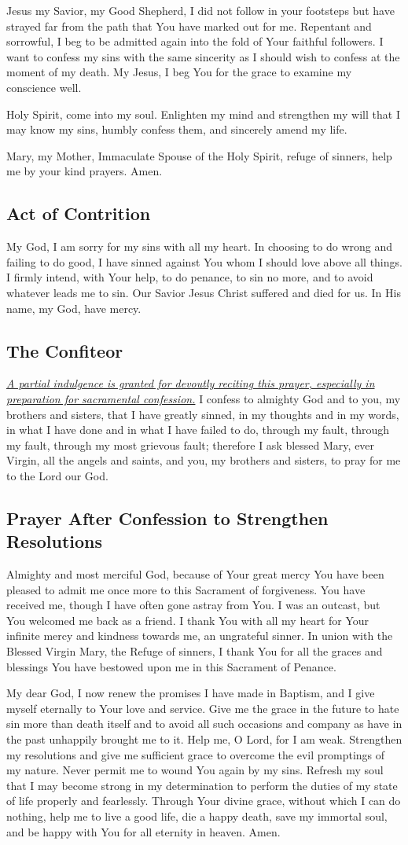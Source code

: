 \documentclass[12pt]{article}
\newcommand{\prayertitle}[1]{\subsection{#1}}
\newcommand{\indulgencedprayertitle}[1]{\prayertitle{#1 \protect\kreuz}}
\newcommand{\note}[1]{{\small{\textsl{#1}}}\newline}
\newcommand{\linkednote}[2]{\hyperlink{#1}{\note{#2}}}
\begin{document}
Jesus my Savior, my Good Shepherd, I did not follow in your footsteps but have strayed far from the path that You have marked out for me.
Repentant and sorrowful, I beg to be admitted again into the fold of Your faithful followers.
I want to confess my sins with the same sincerity as I should wish to confess at the moment of my death.
My Jesus, I beg You for the grace to examine my conscience well.

Holy Spirit, come into my soul.
Enlighten my mind and strengthen my will that I may know my sins, humbly confess them, and sincerely amend my life.

Mary, my Mother, Immaculate Spouse of the Holy Spirit, refuge of sinners, help me by your kind prayers. Amen.

\prayertitle{Act of Contrition}
My God,
I am sorry for my sins with all my heart.
In choosing to do wrong and failing to do good, I have sinned against You whom I should love above all things.
I firmly intend, with Your help, to do penance, to sin no more, and to avoid whatever leads me to sin.
Our Savior Jesus Christ suffered and died for us.
In His name, my God, have mercy.

\indulgencedprayertitle{The Confiteor}
\linkednote{grant9}{A partial indulgence is granted for devoutly reciting this prayer, especially in preparation for sacramental confession.}
I confess to almighty God and to you, my brothers and sisters, that I have greatly sinned, in my thoughts and in my words, in what I have done and in what I have failed to do, through my fault, through my fault, through my most grievous fault;
therefore I ask blessed Mary, ever Virgin, all the angels and saints, and you, my brothers and sisters, to pray for me to the Lord our God.

\prayertitle{Prayer After Confession to Strengthen Resolutions}
Almighty and most merciful God, because of Your great mercy You have been pleased to admit me once more to this Sacrament of forgiveness.
You have received me, though I have often gone astray from You.
I was an outcast, but You welcomed me back as a friend.
I thank You with all my heart for Your infinite mercy and kindness towards me, an ungrateful sinner.
In union with the Blessed Virgin Mary, the Refuge of sinners, I thank You for all the graces and blessings You have bestowed upon me in this Sacrament of Penance.

My dear God, I now renew the promises I have made in Baptism, and I give myself eternally to Your love and service.
Give me the grace in the future to hate sin more than death itself and to avoid all such occasions and company as have in the past unhappily brought me to it.
Help me, O Lord, for I am weak.
Strengthen my resolutions and give me sufficient grace to overcome the evil promptings of my nature.
Never permit me to wound You again by my sins.
Refresh my soul that I may become strong in my determination to perform the duties of my state of life properly and fearlessly.
Through Your divine grace, without which I can do nothing, help me to live a good life, die a happy death, save my immortal soul, and be happy with You for all eternity in heaven. Amen.
\end{document}
